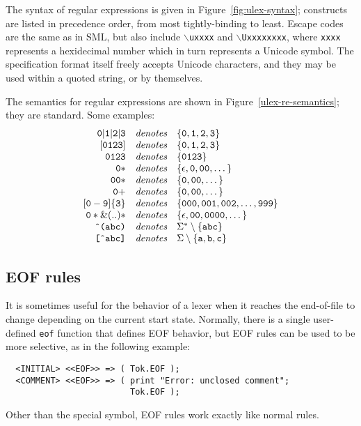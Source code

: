 The syntax of regular expressions is given in Figure~\ref{fig:ulex-syntax}; constructs are listed in precedence order, from most tightly-binding to least.  Escape codes are the same as in SML, but also include \texttt{$\backslash$uxxxx} and \texttt{$\backslash$Uxxxxxxxx}, where \texttt{xxxx} represents a hexidecimal number which in turn represents a Unicode symbol.  The specification format itself freely accepts Unicode characters, and they may be used within a quoted string, or by themselves.

The semantics for \ulex{} regular expressions are shown in Figure~\ref{ulex-re-semantics}; they are standard.  Some examples:
\[
\begin{array}{rcl}
{\tt 0 | 1 | 2 | 3}	& \textit{denotes} &
    \{ \texttt{0}, \texttt{1}, \texttt{2}, \texttt{3} \}	\\
{\tt [0123]}	& \textit{denotes} &
    \{ \texttt{0}, \texttt{1}, \texttt{2}, \texttt{3} \}	\\
{\tt 0123}	& \textit{denotes} &
    \{ \texttt{0123} \}						\\
{\tt 0*}	& \textit{denotes} &
    \{ \epsilon, \texttt{0}, \texttt{00}, \dots \}		\\
{\tt 00*}	& \textit{denotes} &
    \{ \texttt{0}, \texttt{00}, \dots \}		\\
{\tt 0+}	& \textit{denotes} &
    \{ \texttt{0}, \texttt{00}, \dots \}		\\
{\tt [0-9]\{3\}}	& \textit{denotes} &
    \{ \texttt{000}, \texttt{001}, \texttt{002}, \dots, \texttt{999} \}	\\
{\tt 0* \& (..)*}	& \textit{denotes} &
    \{ \epsilon, \texttt{00}, \texttt{0000}, \dots \}	\\
\texttt{\^{ }(abc)}	& \textit{denotes} &
    \Sigma^* \setminus \{ \texttt{abc} \}	\\
\texttt{[\^{ }abc]}	& \textit{denotes} &
    \Sigma \setminus \{ \texttt{a}, \texttt{b}, \texttt{c} \}
\end{array}
\]

\subsection{EOF rules}\label{sec:eof-rules}

It is sometimes useful for the behavior of a lexer when it reaches the end-of-file to change depending on the current start state.  Normally, there is a single user-defined \texttt{eof} function that defines EOF behavior, but EOF rules can be used to be more selective, as in the following example:
\begin{verbatim}
  <INITIAL> <<EOF>> => ( Tok.EOF );
  <COMMENT> <<EOF>> => ( print "Error: unclosed comment";
                         Tok.EOF );
\end{verbatim}
Other than the special  symbol, EOF rules work exactly like normal rules.

